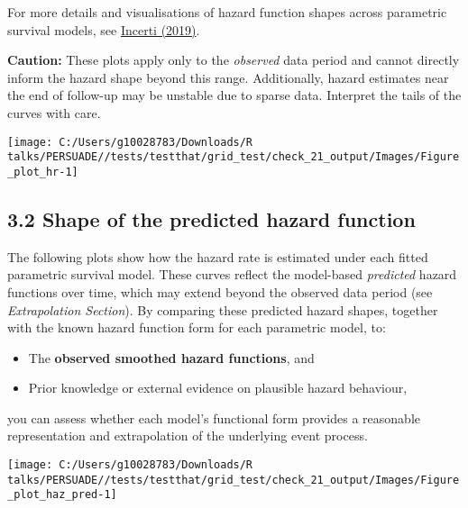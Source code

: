 \documentclass[
]{article}
\providecommand{\tightlist}{%
  \setlength{\itemsep}{0pt}\setlength{\parskip}{0pt}}
\begin{document}
For more details and visualisations of hazard function shapes across
parametric survival models, see
\href{https://devinincerti.com/2019/06/18/parametric_survival.html}{Incerti
(2019)}.

\textbf{Caution:} These plots apply only to the \emph{observed} data
period and cannot directly inform the hazard shape beyond this range.
Additionally, hazard estimates near the end of follow-up may be unstable
due to sparse data. Interpret the tails of the curves with care.

\clearpage

\begin{flushleft}\texttt{[image: C:/Users/g10028783/Downloads/R talks/PERSUADE//tests/testthat/grid\_test/check\_21\_output/Images/Figure\_plot\_hr-1]} \end{flushleft}

\clearpage

\subsection{3.2 Shape of the predicted hazard
function}\label{shape-of-the-predicted-hazard-function}

The following plots show how the hazard rate is estimated under each
fitted parametric survival model. These curves reflect the model-based
\emph{predicted} hazard functions over time, which may extend beyond the
observed data period (see \emph{Extrapolation Section}). By comparing
these predicted hazard shapes, together with the known hazard function
form for each parametric model, to:

\begin{itemize}
\tightlist
\item
  The \textbf{observed smoothed hazard functions}, and\\
\item
  Prior knowledge or external evidence on plausible hazard behaviour,
\end{itemize}

you can assess whether each model's functional form provides a
reasonable representation and extrapolation of the underlying event
process.

\clearpage

\begin{flushleft}\texttt{[image: C:/Users/g10028783/Downloads/R talks/PERSUADE//tests/testthat/grid\_test/check\_21\_output/Images/Figure\_plot\_haz\_pred-1]} \end{flushleft}
\end{document}
